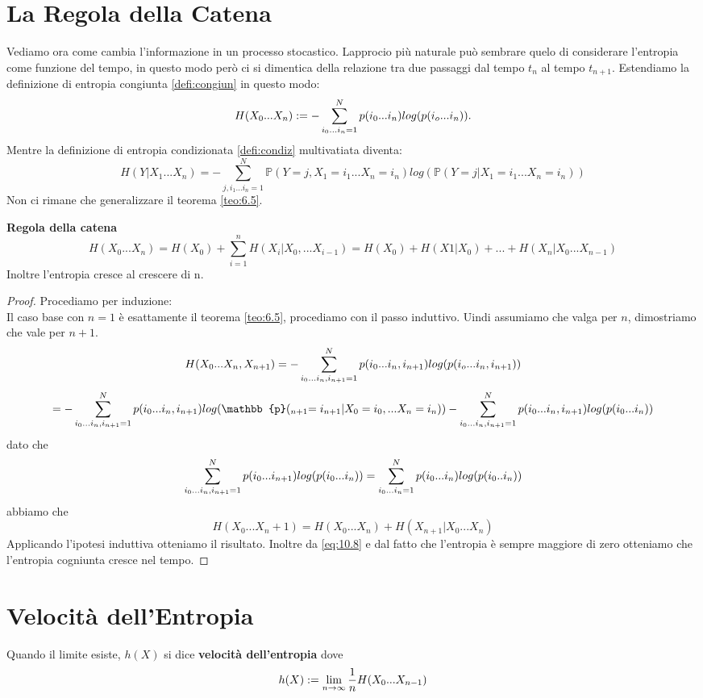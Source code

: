 \section{La Regola della Catena}
\label{sec:chainRule}
Vediamo ora come cambia l'informazione in un processo stocastico. Lapprocio più naturale può sembrare quelo di considerare l'entropia come funzione del tempo, in questo modo però ci si dimentica della relazione tra due passaggi dal tempo $t_n$ al tempo $t_{n+1}$. Estendiamo la definizione di entropia congiunta \ref{defi:congiun} in questo modo:
\begin{equation}
H(X_0...X_n):=- \sum_{i_0...i_n=1}^N p(i_0...i_n)log(p(i_o...i_n)).
\end{equation}
Mentre la definizione di entropia condizionata \ref{defi:condiz} multivatiata diventa:
\begin{equation}
H(Y|X_1...X_n)=-\sum_{j,i_1...i_n=1}^N \mathbb{P}(Y=j,X_1=i_1...X_n=i_n) log(\mathbb{P}(Y=j|X_1=i_1...X_n=i_n))
\end{equation}
Non ci rimane che generalizzare il teorema \ref{teo:6.5}.
\begin{teo} \label{teo:chainRule}
\textbf{Regola della catena}
\begin{equation}
H(X_0...X_n)=H(X_0)+\sum_{i=1}^n  H(X_i|X_0,...X_{i-1})=H(X_0)+H(X1|X_0)+...+H(X_n|X_0...X_{n-1})
\end{equation}
Inoltre l'entropia cresce al crescere di n.
\end{teo}
\begin{proof}
Procediamo per induzione:\\
Il caso base con $n=1$ è esattamente il teorema \ref{teo:6.5}, procediamo con il passo induttivo. Uindi assumiamo che valga per $n$, dimostriamo che vale per $n+1$.
$$H(X_0...X_n, X_{n+1})=- \sum_{i_0...i_n,i_{n+1}=1}^N p(i_0...i_n,i_{n+1})log(p(i_o...i_n,i_{n+1}))$$
$$= - \sumaa p(i_0...i_n,i_{n+1})log(\mathbb{p}(_{n+1}=i_{n+1}|X_0=i_0,...X_n=i_n))-\sumaa p(i_0...i_n,i_{n+1})log(p(i_0...i_n))$$
dato che 
$$\sum_{i_0...i_n,i_{n+1}=1}^N p(i_0...i_{n+1})log(p(i_0...i_n))=\sum_{i_0...i_n=1}^N p(i_0...i_{n})log(p(i_0..i_n))$$
abbiamo che
\begin{equation}\label{eq:10.8}
H(X_0...X_n+1)=H(X_0...X_n)+H(X_{n+1}|X_0...X_n)
\end{equation}
Applicando l'ipotesi induttiva otteniamo il risultato.
Inoltre da \ref{eq:10.8} e dal fatto che l'entropia è sempre maggiore di zero otteniamo che l'entropia cogniunta cresce nel tempo.
\end{proof}


\section{Velocità dell'Entropia}
\label{sec:EntropyRate}
\begin{defi}
Quando il limite esiste, $h(X)$ si dice \textbf{velocità dell'entropia} dove
$$h(X):=\lim_{n\to \infty}\frac{1}{n}H(X_0...X_{n-1})$$
\end{defi}

